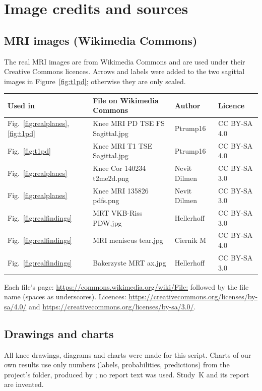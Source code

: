 \chapter{Image credits and sources}
\label{app:credits}

\small

\section*{MRI images (Wikimedia Commons)}

The real MRI images are from Wikimedia Commons and are used under their Creative Commons licences. Arrows and labels were
added to the two sagittal images in Figure~\ref{fig:t1pd}; otherwise they are only scaled.

\begin{center}
\begin{tabularx}{\linewidth}{l>{\raggedright\arraybackslash}X l l}
\toprule
Used in & File on Wikimedia Commons & Author & Licence \\
\midrule
Fig.~\ref{fig:realplanes}, \ref{fig:t1pd} & Knee MRI PD TSE FS Sagittal.jpg & Ptrump16 & CC BY-SA 4.0 \\
Fig.~\ref{fig:t1pd} & Knee MRI T1 TSE Sagittal.jpg & Ptrump16 & CC BY-SA 4.0 \\
Fig.~\ref{fig:realplanes} & Knee Cor 140234 t2me2d.png & Nevit Dilmen & CC BY-SA 3.0 \\
Fig.~\ref{fig:realplanes} & Knee MRI 135826 pdfs.png & Nevit Dilmen & CC BY-SA 3.0 \\
Fig.~\ref{fig:realfindings} & MRT VKB-Riss PDW.jpg & Hellerhoff & CC BY-SA 3.0 \\
Fig.~\ref{fig:realfindings} & MRI meniscus tear.jpg & Ciernik M & CC BY-SA 4.0 \\
Fig.~\ref{fig:realfindings} & Bakerzyste MRT ax.jpg & Hellerhoff & CC BY-SA 3.0 \\
\bottomrule
\end{tabularx}
\end{center}
Each file's page: \url{https://commons.wikimedia.org/wiki/File:} followed by the file name (spaces as underscores).
Licences: \url{https://creativecommons.org/licenses/by-sa/4.0/} and \url{https://creativecommons.org/licenses/by-sa/3.0/}.

\section*{Drawings and charts}

All knee drawings, diagrams and charts were made for this script. Charts of our own results use only numbers (labels,
probabilities, predictions) from the project's  folder, produced by ;
no report text was used. Study~K and its report are invented.

